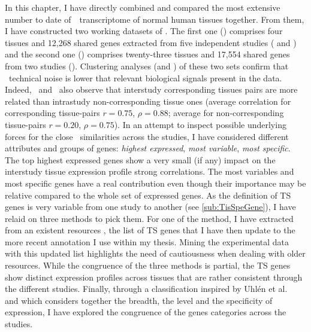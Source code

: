 In this chapter,
I have directly combined and compared
the most extensive number to date of~\Rnaseq\ transcriptome
of normal human tissues together.
From them,
I have constructed two working datasets of \pcgs.
The first one (\setOne) comprises four tissues
and 12,268 shared genes
extracted from five independent studies
(\cite{Krupp2012,VTpaper,Uhlen2015,GTExTranscript} and \ibm)
and the second one (\setTwo) comprises twenty-three tissues
and 17,554 shared genes
from two studies (\cite{Uhlen2015,GTExTranscript}).
Clustering analyses (and \Welchttest) of these two sets
confirm that \Rnaseq\ technical noise is
lower that relevant biological signals present in the data.
Indeed,~\cite{Sudmant2015-zt,Danielsson2015-cn,Yu2015-uh} and~\cite{Uhlen:2016}
also observe that interstudy corresponding tissues pairs are more related than
intrastudy non-corresponding tissue ones
(average correlation for corresponding tissue-pairs $r=0.75$, $\rho=0.88$;
average for non-corresponding tissue-pairs $r=0.20$, $\rho=0.75$).
In an attempt to inspect possible underlying forces for the close \treps\
similarities across the studies,
I have considered different attributes and groups of genes:
\emph{highest expressed}, \emph{most variable}, \emph{most specific}.
The top highest expressed genes show a very small (if any) impact on
the interstudy tissue expression profile strong correlations.
The most variables and most specific genes have a real contribution even though
their importance may be relative compared to the whole set of expressed genes.
As the definition of \gls{TS} genes is very variable from one study to another
(see \cref{sub:TisSpeGene}),
I have relaid on three methods to pick them.
For one of the method,
I have extracted from an existent resources
,
the list of \gls{TS} genes that I have then update to the more recent annotation
I use within my thesis.
Mining the experimental data with this updated list highlights
the need of cautiousness when dealing with older resources.
While the congruence of the three methods is partial,
the \gls{TS} genes show distinct expression profiles across tissues
that are rather consistent through the different studies.
Finally, through a classification inspired
by Uhlén et al.\ 
and which considers together the breadth, the level and the specificity of expression,
I have explored the congruence of the genes categories across the studies.

